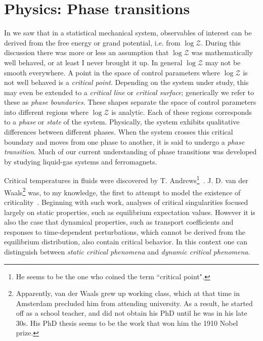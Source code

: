 \chapter{Physics: Phase transitions} 

In  we saw that in a statistical mechanical system,
observables of interest can be derived from the free energy or grand potential,
i.e. from $\log\mathcal{Z}$. During this discussion there was more or less an
assumption that $\log\mathcal{Z}$ was mathematically well behaved, or at least
I never brought it up. In general $\log\mathcal{Z}$ may not be smooth
everywhere. A point in the space of control parameters where $\log\mathcal{Z}$
is not well behaved is a {\it critical point}. Depending
on the system under study, this may even be extended to a {\it critical line} or
{\it critical surface}; generically we refer to these as {\it phase
boundaries}. These shapes separate the space of control parameters
into different regions where $\log\mathcal{Z}$ is analytic. Each of these
regions corresponds to a {\it phase} or {\it state} of
the system. Physically, the system exhibits qualitative differences between
different phases. When the system crosses this critical boundary and moves from
one phase to another, it is said to undergo a {\it phase transition}.
Much of our current understanding of phase transitions was developed by studying
liquid-gas systems and ferromagnets. 

Critical temperatures in fluids were discovered by T. 
Andrews\footnote{He seems to be the one who coined the
term ``critical point".}~\cite{andrews_bakerian_1869}.
J. D. van der Waals\footnote{Apparently, van der Waals grew up working
class, which at that time in Amsterdam precluded him from attending
university. As a result, he started off as a school teacher, and did not
obtain his PhD until he was in his late 30s. His PhD thesis seems to be
the work that won him the 1910 Nobel prize.}
was, to my knowledge, the first to attempt to
model the existence of criticality~\cite{van_der_waals_over_1873}.
Beginning with such work, analyses of critical singularities 
focused largely on static properties, such as equilibrium
expectation values. However it is also the case that dynamical properties,
such as transport coefficients and responses to time-dependent perturbations,
which cannot be derived from the equilibrium distribution, also contain
critical behavior. In this context one can distinguish between
{\it static critical phenomena} and {\it dynamic critical phenomena}.

